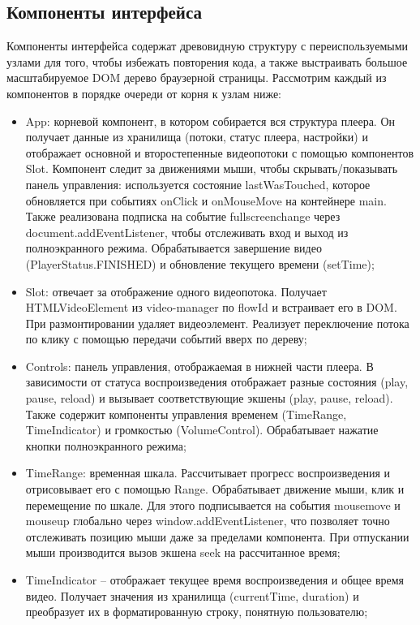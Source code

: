 	\subsection{Компоненты интерфейса}
	
	Компоненты интерфейса содержат древовидную структуру с переиспользуемыми узлами для того, чтобы избежать повторения кода, а также выстраивать большое масштабируемое DOM дерево браузерной страницы. Рассмотрим каждый из компонентов в порядке очереди от корня к узлам ниже:
	
	\begin{itemize}[label=$\bullet$]
		\item App: корневой компонент, в котором собирается вся структура плеера. Он получает данные из хранилища (потоки, статус плеера, настройки) и отображает основной и второстепенные видеопотоки с помощью компонентов Slot. Компонент следит за движениями мыши, чтобы скрывать/показывать панель управления: используется состояние lastWasTouched, которое обновляется при событиях onClick и onMouseMove на контейнере main. Также реализована подписка на событие fullscreenchange через document.addEventListener, чтобы отслеживать вход и выход из полноэкранного режима. Обрабатывается завершение видео (PlayerStatus.FINISHED) и обновление текущего времени (setTime);
		\item Slot: отвечает за отображение одного видеопотока. Получает HTMLVideoElement из video-manager по flowId и встраивает его в DOM. При размонтировании удаляет видеоэлемент. Реализует переключение потока по клику с помощью передачи событий вверх по дереву;
		\item Controls: панель управления, отображаемая в нижней части плеера. В зависимости от статуса воспроизведения отображает разные состояния (play, pause, reload) и вызывает соответствующие экшены (play, pause, reload). Также содержит компоненты управления временем (TimeRange, TimeIndicator) и громкостью (VolumeControl). Обрабатывает нажатие кнопки полноэкранного режима;
		\item TimeRange: временная шкала. Рассчитывает прогресс воспроизведения и отрисовывает его с помощью Range. Обрабатывает движение мыши, клик и перемещение по шкале. Для этого подписывается на события mousemove и mouseup глобально через window.addEventListener, что позволяет точно отслеживать позицию мыши даже за пределами компонента. При отпускании мыши производится вызов экшена seek на рассчитанное время;
		\item TimeIndicator – отображает текущее время воспроизведения и общее время видео. Получает значения из хранилища (currentTime, duration) и преобразует их в форматированную строку, понятную пользователю;

\end{itemize}
